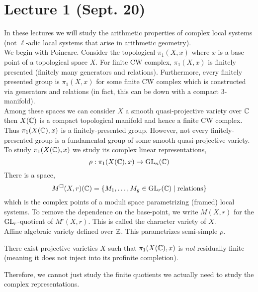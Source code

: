 \documentclass[12pt]{article}
\begin{document}
\section{Lecture 1 (Sept. 20)}

\newcommand{\Msq}{M^{\square}}
\newcommand{\LL}{\mathbb{L}}
\newcommand{\alg}{\mathrm{alg}}
\newcommand{\X}{\mathfrak{X}}
\newcommand{\tame}{\mathrm{tame}}
\newcommand{\irred}{\mathrm{irred}}
\newcommand{\cH}{\mathscr{H}}
\renewcommand{\gr}{\mathbf{gr}}
\newcommand{\Fil}{\mathrm{Fil}}

In these lectures we will study the arithmetic properties of complex local systems (not $\ell$-adic local systems that arise in arithmetic geometry).
\bigskip\\
We begin with Poincare. Consider the topological $\pi_1(X, x)$ where $x$ is a base point of a topological space $X$. For finite CW complex, $\pi_1(X, x)$ is finitely presented (finitely many generators and relations). Furthermore, every finitely presented group is $\pi_1(X, x)$ for some finite CW complex which is constructed via generators and relations (in fact, this can be down with a compact 3-manifold). 
\bigskip\\
Among these spaces we can consider $X$ a smooth quasi-projective variety over $\mathbb{C}$ then $X(\mathbb{C})$ is a compact topological manifold and hence a finite CW complex. Thus $\pi_1(X(\mathbb{C}), x)$ is a finitely-presented group. However, not every finitely-presented group is a fundamental group of some smooth quasi-projective variety. 
\bigskip\\
To study $\pi_1(X(\mathbb{C}), x)$ we study its complex linear representations,
\[ \rho : \pi_1(X(\mathbb{C}), x) \to \mathrm{GL}_n(\mathbb{C}) \]
There is a space,
\[ \Msq(X, r)(\CC) = \{ M_1, \dots, M_g \in \GL_r(\CC) \mid \text{relations} \} \]
which is the complex points of a moduli space parametrizing (framed) local systems. To remove the dependence on the base-point, we write $M(X, r)$ for the $\mathrm{GL}_r$-quotient of $\Msq(X, r)$. This is called the character variety of $X$. 
\bigskip\\
Affine algebraic variety defined over $\mathbb{Z}$. This parametrizes semi-simple $\rho$.

\begin{theorem}[Toledo]
There exist projective varieties $X$ such that $\pi_1(X(\mathbb{C}), x)$ is \textit{not} residually finite (meaning it does not inject into its profinite completion). 
\end{theorem}

\begin{rmk}
Therefore, we cannot just study the finite quotients we actually need to study the complex representations. 
\end{rmk}
\end{document}
